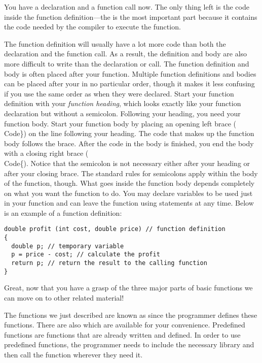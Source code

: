 You have a declaration and a function call now. 
The only thing left is the code inside the function definition---the  is the most important part because it contains the code needed by the compiler to execute the function.

The function definition will usually have a lot more code than both the declaration and the function call.
As a result, the definition and body are also more difficult to write than the declaration or call. 
The function definition and body is often placed after your  function. 
Multiple function definitions and bodies can be placed after your  in no particular order, though it makes it less confusing if you use the same order as when they were declared.  
Start your function definition with your \emph{function heading}, which looks exactly like your function declaration but without a semicolon. 
Following your heading, you need your function body. 
Start your function body by placing an opening left brace (\\Code{\}}) on the line following your heading. 
The code that makes up the function body follows the brace.
After the code in the body is finished, you end the body with a closing right brace (\\Code{\{}). 
Notice that the semicolon is not necessary either after your heading or after your closing brace. 
The standard rules for semicolons apply within the body of the function, though.  
What goes inside the function body depends completely on what you want the function to do. 
You may declare variables to be used just in your function and can leave the function using  statements at any time. 
Below is an example of a function definition:

\begin{lstlisting} 
double profit (int cost, double price) // function definition
{
  double p; // temporary variable
  p = price - cost; // calculate the profit
  return p; // return the result to the calling function
}
\end{lstlisting}
 
Great, now that you have a grasp of the three major parts of basic functions we can move on to other related material!
 
The functions we just described are known as  since the programmer defines these functions. 
There are also  which are available for your convenience. 
Predefined functions are functions that are already written and defined. 
In order to use predefined functions, the programmer needs to include the necessary library and then call the function wherever they need it.


